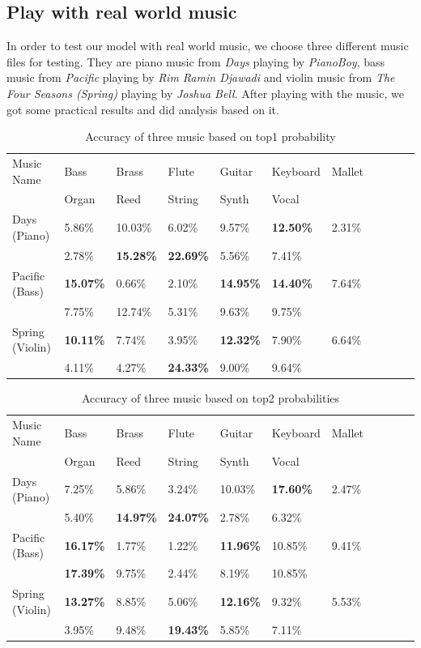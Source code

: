 \documentclass{article}
\begin{document}
\subsection{Play with real world music}

\noindent In order to test our model with real world music, we choose three different music files for testing. They are piano music from \emph{Days} playing by \emph{PianoBoy}, bass music from \emph{Pacific} playing by \emph{Rim Ramin Djawadi} and violin music from \emph{The Four Seasons (Spring)} playing by \emph{Joshua Bell}. After playing with the music, we got some practical results and did analysis based on it.

\begin{table}[h]
  \caption{Accuracy of three music based on top1 probability}
  \label{tab:3music_top1}
  \centering
  \begin{tabular}{lllllllllll}
    \toprule
    Music Name  &Bass & Brass & Flute & Guitar & Keyboard &Mallet\\
    &Organ & Reed	& String & Synth & Vocal\\
    \midrule
    Days (Piano) & 5.86\%& 10.03\%&6.02\%&9.57\%&\textbf{{\color{red} 12.50\%}}&2.31\%\\
    &2.78\%&\textbf{15.28\%}&\textbf{22.69\%}&5.56\%&7.41\%\\
    \midrule
    Pacific (Bass) & \textbf{{\color{red} 15.07\%}}&0.66\%&2.10\%&\textbf{14.95\%}&\textbf{14.40\%}&7.64\%\\
    &7.75\%&12.74\%&5.31\%&9.63\%&9.75\%\\
    \midrule
    Spring (Violin) & \textbf{10.11\%}&7.74\%&3.95\%&\textbf{12.32\%}&7.90\%&6.64\%\\
    &4.11\%&4.27\%&\textbf{{\color{red} 24.33\%}}&9.00\%&9.64\%\\
    \bottomrule
  \end{tabular}
\end{table}

\begin{table}[h]
  \caption{Accuracy of three music based on top2 probabilities}
  \label{tab:3music_top2}
  \centering
  \begin{tabular}{lllllllllll}
    \toprule
    Music Name  &Bass & Brass & Flute & Guitar & Keyboard &Mallet\\
    &Organ & Reed	& String & Synth & Vocal\\
    \midrule
    Days (Piano) & 7.25\%& 5.86\%&3.24\%&10.03\%&\textbf{{\color{red} 17.60\%}}&2.47\%\\
    &5.40\%&\textbf{14.97\%}&\textbf{24.07\%}&2.78\%&6.32\%\\
    \midrule
    Pacific (Bass) & \textbf{{\color{red} 16.17\%}}&1.77\%& 1.22\%&\textbf{11.96\%}&10.85\%&9.41\%\\
    &\textbf{17.39\%}&9.75\%&2.44\%&8.19\%&10.85\%\\
    \midrule
    Spring (Violin) & \textbf{13.27\%}&8.85\%&5.06\%&\textbf{12.16\%}&9.32\%&5.53\%\\
    &3.95\%&9.48\%&\textbf{{\color{red}19.43\%}}&5.85\%&7.11\%\\
    \bottomrule
  \end{tabular}
\end{table}
\end{document}
